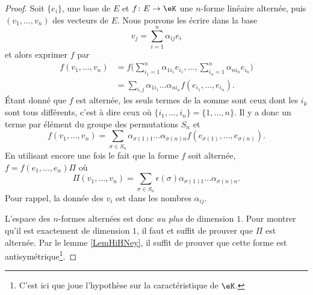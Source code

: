 \begin{proof}
    Soit \( \{ e_i \}\), une base de \( E\) et \( f\colon E\to \eK\) une \( n\)-forme linéaire alternée, puis \( (v_1,\ldots, v_n)\) des vecteurs de \( E\). Nous pouvons les écrire dans la base
    \begin{equation}
        v_j=\sum_{i=1}^n\alpha_{ij}e_i
    \end{equation}
    et alors exprimer \( f\) par
    \begin{subequations}
        \begin{align}
            f(v_1,\ldots, v_n)&=f\big( \sum_{i_1=1}^n\alpha_{1i_1}e_{i_1},\ldots, \sum_{i_n=1}^n\alpha_{ni_n}e_{i_n} \big)\\
            &=\sum_{i,j}\alpha_{1i_1}\ldots \alpha_{ni_n}f(e_{i_1},\ldots, e_{i_n}).
        \end{align}
    \end{subequations}
    Étant donné que \( f\) est alternée, les seuls termes de la somme sont ceux dont les \( i_k\) sont tous différents, c'est à dire ceux où \( \{ i_1,\ldots, i_n \}=\{ 1,\ldots, n \}\). Il y a donc un terme par élément du groupe des permutations \( S_n\) et
    \begin{equation}
        f(v_1,\ldots, v_n)=\sum_{\sigma\in S_n}\alpha_{\sigma(1)1}\ldots \alpha_{\sigma(n)n}f(e_{\sigma(1)},\ldots, e_{\sigma(n)}).
    \end{equation}
    En utilisant encore une fois le fait que la forme \( f\) soit alternée, \( f=f(e_1,\ldots, e_n)\Pi\) où
    \begin{equation}
        \Pi(v_1,\ldots, v_n)=\sum_{\sigma\in S_n}\epsilon(\sigma)\alpha_{\sigma(1)1}\ldots \alpha_{\sigma(n)n}.
    \end{equation}
    Pour rappel, la donnée des \( v_i\) est dans les nombres \( \alpha_{ij}\).
    
    L'espace des \( n\)-formes alternées est donc \emph{au plus} de dimension \( 1\). Pour montrer qu'il est exactement de dimension \( 1\), il faut et suffit de prouver que \( \Pi\) est alternée. Par le lemme \ref{LemHiHNey}, il suffit de prouver que cette forme est antisymétrique\footnote{C'est ici que joue l'hypothèse sur la caractéristique de \( \eK\).}. 


\end{proof}
